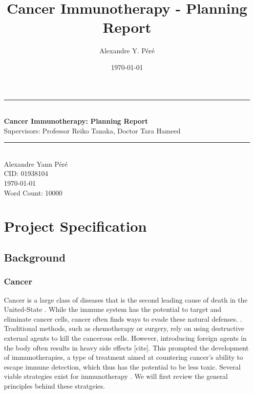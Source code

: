 \documentclass[11pt]{article}
\title{Cancer Immunotherapy - Planning Report}
\author{Alexandre Y. Péré }
\date{\today}
\begin{document}
\begin{titlepage}
    \newcommand{\HRule}{\rule{\linewidth}{0.5mm}}
    \begin{center}
        \HRule \\[0.4cm]
    { \huge \bfseries Cancer Immunotherapy: Planning Report \\[0.15cm] }
    Supervisors: Professor Reiko Tanaka, Doctor Tara Hameed 
    \\[0.4cm]
    \HRule \\[0.5cm]
    Alexandre Yann Péré \\[0.1cm]
    CID: 01938104  \\[0.1cm]
    \today \\ [0.1cm]
    \vspace{10pt}
    Word Count: 10000
    \end{center}
\end{titlepage}

\tableofcontents


%

\pagebreak 
\section{Project Specification}\label{sec:specs}

\subsection{Background}
\subsubsection{Cancer}
Cancer is a large class of diseases that is the second leading cause of death in the United-State \cite{nchs}. While the immune system has the potential to target and eliminate cancer cells, cancer often finds ways to evade these natural defenses. \cite{EvasionMech}. Traditional methods, such as chemotherapy or surgery, rely on using destructive external agents to kill the cancerous cells. However, introducing foreign agents in the body often results in heavy side effects [cite]. This prompted the development of immunotherapies, a type of treatment aimed at countering cancer's ability to escape immune detection, which thus has the potential to be less toxic. Several viable strategies exist for immunotherapy \cite{ReviewCPI}. We will first review the general principles behind these stratgeies.
\end{document}

